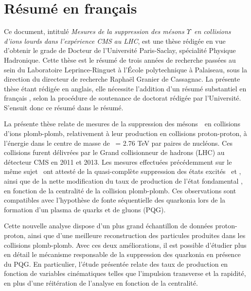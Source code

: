 \chapter*{Résumé en français}
\fancyhf{}

Ce document, intitulé \textit{Mesures de la suppression des mésons
  $\Upsilon$~en collisions d'ions lourds dans l'expérience CMS au LHC},
est une thèse rédigée en vue d'obtenir le grade de Docteur de
l'Université Paris-Saclay, spécialité Physique Hadronique. Cette thèse
est le résumé de trois années de recherche passées au sein du
Laboratoire Leprince-Ringuet à l'École polytechnique à Palaiseau, sous
la direction du directeur de recherche Raphaël Granier de
Cassagnac. La présente thèse étant rédigée en anglais, elle nécessite
l'addition d'un \og résumé substantiel en français \fg{}, selon la procédure de
soutenance de doctorat rédigée par
l'Université\cite{saclaycons}. S'ensuit donc ce résumé dans le résumé.


\vspace{2.5em}
La présente thèse relate de mesures de la suppression
des mésons~\PgU\ en collisions d'ions plomb-plomb, relativement
à leur production en collisions proton-proton, à l'énergie dans le
centre de masse de \s\ = 2.76 TeV par paires de nucléons. Ces
collisions furent délivrées par le Grand collisionneur de hadrons
(LHC) au détecteur CMS en 2011 et 2013. Les mesures
effectuées précédemment sur le même
sujet~\cite{torsten,HIN-11-007,11-011} ont attesté de la quasi-complète
suppression des états excités \PgUb\ et \PgUc, ainsi que de la
nette modification du taux de production de l'état fondamental \PgUa,
en fonction de la centralité
de la collision plomb-plomb. Ces observations sont compatibles avec
l'hypothèse de fonte séquentielle des quarkonia lors de la formation
d'un plasma de quarks et de gluons (PQG).

Cette nouvelle analyse dispose d'un plus grand échantillon de
données proton-proton, ainsi que d'une meilleure reconstruction des
particules produites dans les collisions plomb-plomb. Avec ces deux
améliorations, il est possible d'étudier plus en détail le mécanisme
responsable de la suppression des quarkonia en présence du PQG. En
particulier, l'étude présentée relate des taux de production en fonction de variables
cinématiques telles que l'impulsion transverse et la rapidité, en plus d'une réitération de l'analyse en
fonction de la centralité.

